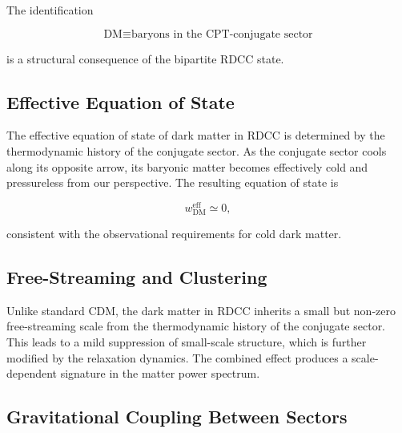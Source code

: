 \documentclass[11pt,a4paper]{article}
\begin{document}
The identification


\[
\text{DM} \equiv \text{baryons in the CPT-conjugate sector}
\]


is a structural consequence of the bipartite RDCC state.




\subsection{Effective Equation of State}

The effective equation of state of dark matter in RDCC is determined by the
thermodynamic history of the conjugate sector. As the conjugate sector cools
along its opposite arrow, its baryonic matter becomes effectively cold and
pressureless from our perspective. The resulting equation of state is


\[
w_{\mathrm{DM}}^{\mathrm{eff}} \simeq 0,
\]


consistent with the observational requirements for cold dark matter.




\subsection{Free-Streaming and Clustering}

Unlike standard CDM, the dark matter in RDCC inherits a small but non-zero
free-streaming scale from the thermodynamic history of the conjugate sector.
This leads to a mild suppression of small-scale structure, which is further
modified by the relaxation dynamics. The combined effect produces a
scale-dependent signature in the matter power spectrum.




\subsection{Gravitational Coupling Between Sectors}
\end{document}
